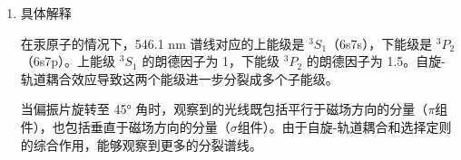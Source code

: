 \documentclass[dvipsnames, svgnames,a4paper,11pt]{article}
\begin{document}
\begin{enumerate}
\begin{enumerate}
			\item 偏振片选择性：
			\begin{itemize}
				\item 偏振片旋转至 45° 角时，既可以通过平行于磁场方向的偏振光，也可以通过垂直于磁场方向的偏振光。
				\item 因此，可以观察到不同偏振方向的所有分裂谱线，而不仅仅是三条谱线。
			\end{itemize}
			
			\item 跃迁规则：
			\begin{itemize}
				\item 各个分裂子能级之间的跃迁遵循不同的选择定则（例如，$\Delta m_J = 0, \pm 1$），这也增加了分裂谱线的数目。
				\item 在反常塞曼效应中，这些跃迁规则会导致多于三条的谱线分裂现象。
			\end{itemize}
		\end{enumerate}
		
		\item 具体解释
		
		在汞原子的情况下，546.1 nm 谱线对应的上能级是 \(^3S_1\)（6s7s），下能级是 \(^3P_2\)（6s7p）。上能级 \(^3S_1\) 的朗德因子为 1，下能级 \(^3P_2\) 的朗德因子为 1.5。自旋-轨道耦合效应导致这两个能级进一步分裂成多个子能级。
		
		当偏振片旋转至 45° 角时，观察到的光线既包括平行于磁场方向的分量（$\pi$组件），也包括垂直于磁场方向的分量（$\sigma$组件）。由于自旋-轨道耦合和选择定则的综合作用，能够观察到更多的分裂谱线。
	\end{enumerate}
	
\end{document}
